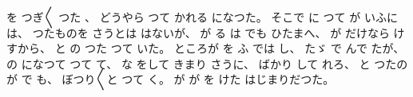 %
を
つぎ〳〵
つた
、
%
どうやら
つて
かれる
になつた。
%
そこで
に
つて
が
いふには、
%
つたものを
さうとは
はないが、
%
が
る
は
でも
ひたまへ、
%
が
だけなら
け
すから、
%
%
と
の
つた
つて
いた。
%
ところが
を
ふ
では
し、
%
たゞ
で
んで
たが、
%
の
になつて
つて
て、
%
な
をして
きまり
さうに、
%
ばかり
して
れろ、
%
と
つたのが
で
も、
%
ぼつり〳〵と
つて
く。
%
が
が
を
けた
はじまりだつた。
